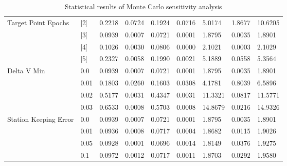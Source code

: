 \begin{table}[H]
\begin{tabular}{lllllllll}
Target Point Epochs & [2] & 0.2218 & 0.0724 & 0.1924 & 0.0716 & 5.0174 & 1.8677 & 10.6205 \\ 
 & [3] & 0.0939 & 0.0007 & 0.0721 & 0.0001 & 1.8795 & 0.0035 & 1.8901 \\ 
 & [4] & 0.1026 & 0.0030 & 0.0806 & 0.0000 & 2.1021 & 0.0003 & 2.1029 \\ 
 & [5] & 0.2327 & 0.0058 & 0.1990 & 0.0021 & 5.1889 & 0.0558 & 5.3564 \\ 
Delta V Min & 0.0 & 0.0939 & 0.0007 & 0.0721 & 0.0001 & 1.8795 & 0.0035 & 1.8901 \\ 
 & 0.01 & 0.1803 & 0.0260 & 0.1603 & 0.0308 & 4.1781 & 0.8039 & 6.5896 \\ 
 & 0.02 & 0.5177 & 0.0031 & 0.4347 & 0.0031 & 11.3321 & 0.0817 & 11.5771 \\ 
 & 0.03 & 0.6533 & 0.0008 & 0.5703 & 0.0008 & 14.8679 & 0.0216 & 14.9326 \\ 
Station Keeping Error & 0.0 & 0.0939 & 0.0007 & 0.0721 & 0.0001 & 1.8795 & 0.0035 & 1.8901 \\ 
 & 0.01 & 0.0936 & 0.0008 & 0.0717 & 0.0004 & 1.8682 & 0.0115 & 1.9026 \\ 
 & 0.05 & 0.0928 & 0.0001 & 0.0696 & 0.0014 & 1.8149 & 0.0376 & 1.9275 \\ 
 & 0.1 & 0.0972 & 0.0012 & 0.0717 & 0.0011 & 1.8703 & 0.0292 & 1.9580 \\ 
\end{tabular}
\caption{Statistical results of Monte Carlo sensitivity analysis}
\label{tab:SensitivityAnalysis}
\end{table}